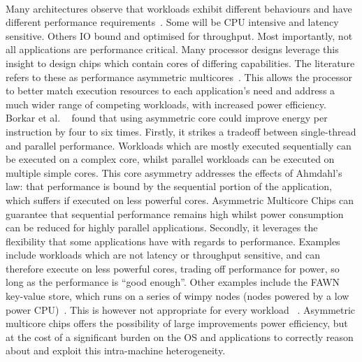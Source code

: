 \paragraph{} Many architectures observe that workloads exhibit different behaviours and have different performance requirements~\cite{greenhalgh2011biglittle}. Some will be CPU intensive and latency sensitive. Others IO bound and optimised for throughput. Most importantly, not all applications are performance critical. Many processor designs
leverage this insight to design chips which contain cores of differing 
capabilities. The literature refers to these as performance asymmetric multicores~\cite{balakrishnan2005impactperfasym}. This allows the processor to better match execution resources to each  application's need and address a much wider range of competing workloads, 
with increased power efficiency. Borkar et al. ~\cite{borkar2011future} found that using asymmetric core could improve energy per instruction by four to six times. Firstly, it strikes a tradeoff between single-thread and parallel performance. Workloads which are mostly executed sequentially can be executed on a complex core, whilst parallel workloads can be executed on multiple simple cores. This core asymmetry addresses the effects of Ahmdahl's law: that performance is bound by the sequential portion of the application, which suffers if executed on less powerful cores. Asymmetric Multicore Chips can guarantee that sequential performance remains high whilst power consumption can be reduced for highly parallel applications. Secondly, it leverages the flexibility that some applications have with regards to performance. Examples include workloads which are not latency or throughput sensitive, and can therefore execute on less powerful cores, trading off performance for power, so long as the performance is ``good enough''. Other examples include the FAWN key-value store, which runs on a series of wimpy nodes (nodes powered by a low power CPU)~\cite{andersen2009fawn}. This is however not appropriate for every workload ~\cite{lang2010nonwimpy}.
Asymmetric multicore chips offers the possibility of large improvements power efficiency, but at the cost of a significant burden on the OS and applications to correctly reason about and exploit this intra-machine heterogeneity. 

